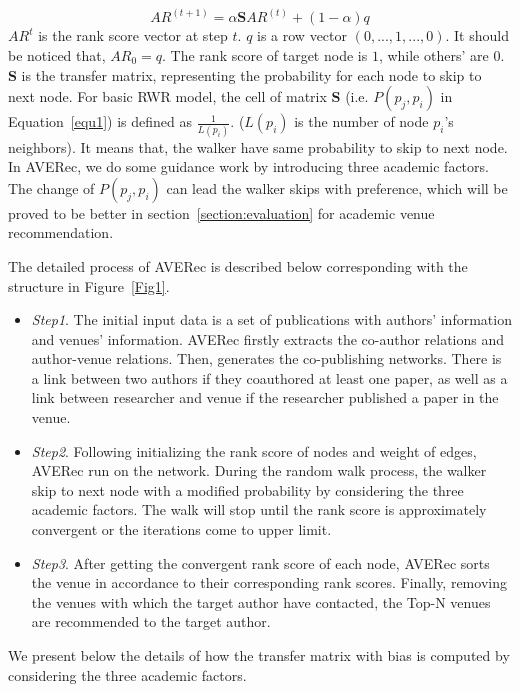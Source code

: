 \documentclass[9pt]{acm_proc_article-sp}
\begin{document}
\begin{equation}
\label{equ2}
AR^{(t+1)}=\alpha \mathbf{S}AR^{(t)}+(1-\alpha)q
\end{equation}
$AR^{t}$ is the rank score vector at step $t$. $q$ is a row vector $(0,...,1,...,0)$. It should be noticed that, $AR_{0}=q$. The rank score of target node is $1$, while others' are $0$. $\mathbf{S}$ is the transfer matrix, representing the probability for each node to skip to next node. For basic RWR model, the cell of matrix $\mathbf{S}$ (i.e. $P(p_{j},p_{i})$ in Equation~\ref{equ1}) is defined as $\frac{1}{L(p_{i})}$. ($L(p_{i})$ is the number of node $p_{i}$'s neighbors). It means that, the walker have same probability to skip to next node. In AVERec, we do some guidance work by introducing three academic factors. The change of $P(p_{j},p_{i})$ can lead the walker skips with preference, which will be proved to be better in section~\ref{section:evaluation} for academic venue recommendation.

The detailed process of AVERec is described below corresponding with the structure in Figure~\ref{Fig1}.

\begin{itemize}
  \item \emph{Step1}. The initial input data is a set of publications with authors' information and venues' information. AVERec firstly extracts the co-author relations and author-venue relations. Then, generates the co-publishing networks. There is a link between two authors if they coauthored at least one paper, as well as a link between researcher and venue if the researcher published a paper in the venue.
  \item \emph{Step2}. Following initializing the rank score of nodes and weight of edges, AVERec run on the network. During the random walk process, the walker skip to next node with a modified probability by considering the three academic factors. The walk will stop until the rank score is approximately convergent or the iterations come to upper limit.
  \item \emph{Step3}. After getting the convergent rank score of each node, AVERec sorts the venue in accordance to their corresponding rank scores. Finally, removing the venues with which the target author have contacted, the Top-N venues are recommended to the target author.
\end{itemize}

We present below the details of how the transfer matrix with bias is computed by considering the three academic factors.
\end{document}
